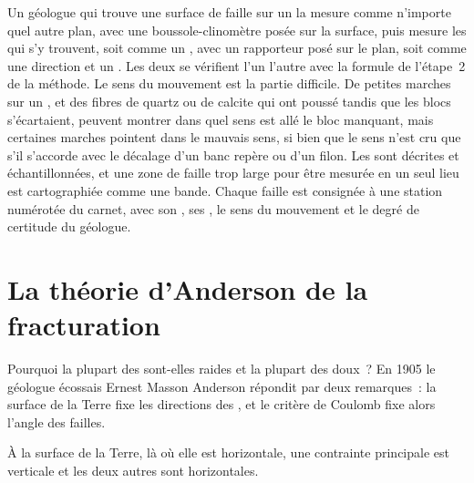 \begin{inthefield}
Un géologue qui trouve une surface de faille sur un  la mesure comme n'importe quel autre
plan, avec une boussole-clinomètre posée sur la surface, puis mesure les
 qui s'y trouvent, soit comme un , avec un rapporteur posé sur le plan, soit
comme une direction et un . Les deux se vérifient l'un l'autre avec la
formule de l'étape~2 de la méthode. Le sens du mouvement est la partie difficile. De petites
marches sur un , et des fibres de quartz ou de calcite qui ont poussé tandis que les
blocs s'écartaient, peuvent montrer dans quel sens est allé le bloc manquant, mais certaines marches
pointent dans le mauvais sens, si bien que le sens n'est cru que s'il s'accorde avec le
décalage d'un banc repère ou d'un filon. Les  sont décrites et échantillonnées, et une
zone de faille trop large pour être mesurée en un seul lieu est cartographiée comme une bande. Chaque faille est
consignée à une station numérotée du carnet, avec son , ses
, le sens du mouvement et le degré de certitude du géologue.
\end{inthefield}

\section{La théorie d'Anderson de la fracturation}\label{sec:b1:faults-folds-fabrics:anderson}

Pourquoi la plupart des  sont-elles raides et la plupart des  doux~? En 1905 le
géologue écossais Ernest Masson Anderson répondit par deux remarques~: la surface de la
Terre fixe les directions des , et le critère de Coulomb
fixe alors l'angle des failles.

\begin{proposition}\label{prop:b1:faults-folds-fabrics:free-surface}
À la surface de la Terre, là où elle est horizontale, une contrainte principale est
verticale et les deux autres sont horizontales.
\end{proposition}

